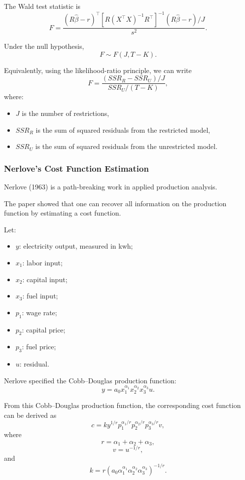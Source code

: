 The Wald test statistic is
\[
F
=
\frac{
(R\hat\beta-r)^\top
\left[
R(X^\top X)^{-1}R^\top
\right]^{-1}
(R\hat\beta-r)/J
}{
s^2
}.
\]

Under the null hypothesis,
\[
F\sim F(J,T-K).
\]

Equivalently, using the likelihood-ratio principle, we can write
\[
F
=
\frac{
(SSR_R-SSR_U)/J
}{
SSR_U/(T-K)
},
\]
where:

\begin{itemize}
    \item \(J\) is the number of restrictions,
    \item \(SSR_R\) is the sum of squared residuals from the restricted model,
    \item \(SSR_U\) is the sum of squared residuals from the unrestricted model.
\end{itemize}

\subsubsection{Nerlove's Cost Function Estimation}

Nerlove (1963) is a path-breaking work in applied production analysis.

The paper showed that one can recover all information on the production function by estimating a cost function.

Let:

\begin{itemize}
    \item \(y\): electricity output, measured in kwh;
    \item \(x_1\): labor input;
    \item \(x_2\): capital input;
    \item \(x_3\): fuel input;
    \item \(p_1\): wage rate;
    \item \(p_2\): capital price;
    \item \(p_3\): fuel price;
    \item \(u\): residual.
\end{itemize}

Nerlove specified the Cobb--Douglas production function:
\[
y
=
a_0x_1^{\alpha_1}
x_2^{\alpha_2}
x_3^{\alpha_3}
u.
\]

From this Cobb--Douglas production function, the corresponding cost function can be derived as
\[
c
=
ky^{1/r}
p_1^{\alpha_1/r}
p_2^{\alpha_2/r}
p_3^{\alpha_3/r}
v,
\]
where
\[
r=\alpha_1+\alpha_2+\alpha_3,
\]
\[
v=u^{-1/r},
\]
and
\[
k
=
r
\left(
a_0
\alpha_1^{\alpha_1}
\alpha_2^{\alpha_2}
\alpha_3^{\alpha_3}
\right)^{-1/r}.
\]

